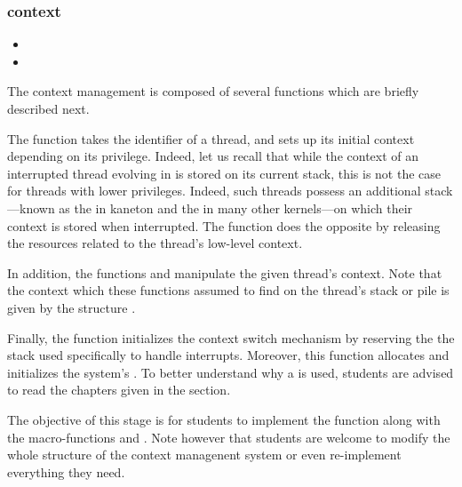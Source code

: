 \subsubsection*{context}

\begin{itemize}
  \item
  \item
\end{itemize}

The  context management is composed of several functions which
are briefly described next.

The  function takes the identifier of a
thread, and sets up its initial context depending on its privilege. Indeed,
let us recall that while the context of an interrupted thread evolving in
 is stored on its current stack, this is not the case for threads
with lower privileges. Indeed, such threads possess an additional
stack---known as the  in kaneton and the  in
many other kernels---on which their context is stored when interrupted.
The function  does the opposite by
releasing the resources related to the thread's low-level context.

In addition, the functions  and
 manipulate the given thread's context.
Note that the context which these functions assumed to find on the thread's
stack or pile is given by the structure .

Finally, the  function initializes the
context switch mechanism by reserving the 
\ie{} the stack used specifically to handle interrupts. Moreover, this
function allocates and initializes the system's . To better understand why a  is used, students are advised
to read the chapters given in the  section.

The objective of this stage is for students to implement the
 function along with the macro-functions
 and
. Note however that students are
welcome to modify the whole structure of the context managenent system or
even re-implement everything they need.

